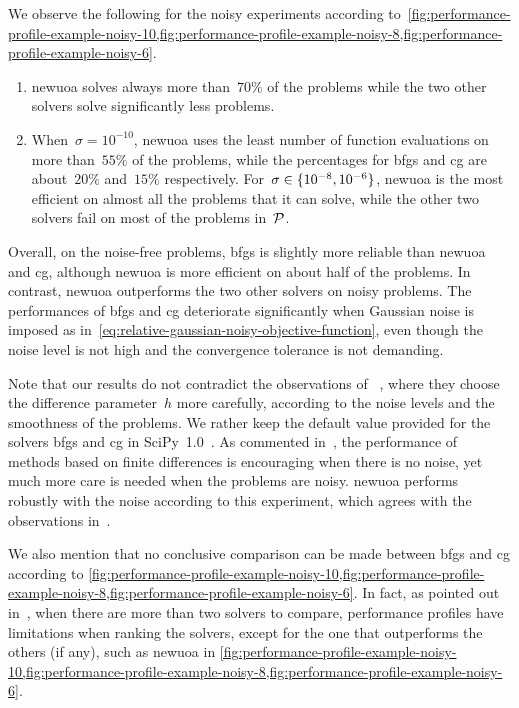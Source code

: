 We observe the following for the noisy experiments according to~\cref{fig:performance-profile-example-noisy-10,fig:performance-profile-example-noisy-8,fig:performance-profile-example-noisy-6}.
\begin{enumerate}
    \item \Gls{newuoa} solves always more than~$70\%$ of the problems while the two other solvers solve significantly less problems.
    \item When~$\sigma = 10^{-10}$, \gls{newuoa} uses the least number of function evaluations on more than~$55\%$ of the problems, while the percentages for \gls{bfgs} and \gls{cg} are about~$20\%$ and~$15\%$ respectively.
    For~$\sigma \in \{10^{-8}, 10^{-6}\}$, \gls{newuoa} is the most efficient on almost all the problems that it can solve, while the other two solvers fail on most of the problems in~$\mathcal{P}$.
\end{enumerate}

Overall, on the noise-free problems, \gls{bfgs} is slightly more reliable than \gls{newuoa} and \gls{cg}, although \gls{newuoa} is more efficient on about half of the problems.
In contrast, \gls{newuoa} outperforms the two other solvers on noisy problems.
The performances of \gls{bfgs} and \gls{cg} deteriorate significantly when Gaussian noise is imposed as in~\cref{eq:relative-gaussian-noisy-objective-function}, even though the noise level is not high and the convergence tolerance is not demanding.

Note that our results do not contradict the observations of \citeauthor{Shi_Etal_2021}~\cite{Shi_Etal_2021}, where they choose the difference parameter~$h$ more carefully, according to the noise levels and the smoothness of the problems.
We rather keep the default value provided for the solvers \gls{bfgs} and \gls{cg} in SciPy~1.0~\cite{Virtanen_Etal_2020}.
As commented in~\cite{Shi_Etal_2021}, the performance of methods based on finite differences is encouraging when there is no noise, yet much more care is needed when the problems are noisy.
\Gls{newuoa} performs robustly with the noise according to this experiment, which agrees with the observations in~\cite{Shi_Etal_2021}.

We also mention that no conclusive comparison can be made between \gls{bfgs} and \gls{cg} according to \cref{fig:performance-profile-example-noisy-10,fig:performance-profile-example-noisy-8,fig:performance-profile-example-noisy-6}.
In fact, as pointed out in~\cite{Gould_Scott_2016}, when there are more than two solvers to compare, performance profiles have limitations when ranking the solvers, except for the one that outperforms the others (if any), such as \gls{newuoa} in \cref{fig:performance-profile-example-noisy-10,fig:performance-profile-example-noisy-8,fig:performance-profile-example-noisy-6}.

